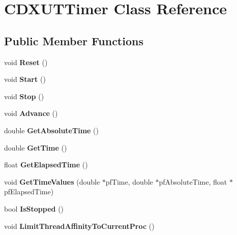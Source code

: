 \hypertarget{class_c_d_x_u_t_timer}{\section{C\+D\+X\+U\+T\+Timer Class Reference}
\label{class_c_d_x_u_t_timer}
}
\subsection*{Public Member Functions}
\begin{DoxyCompactItemize}
\item 
\hypertarget{class_c_d_x_u_t_timer_adc40e951f6157dc82883294a19f8e04b}{void {\bfseries Reset} ()}\label{class_c_d_x_u_t_timer_adc40e951f6157dc82883294a19f8e04b}

\item 
\hypertarget{class_c_d_x_u_t_timer_a970f9d5dc0b3b84f6445ec756c188f4b}{void {\bfseries Start} ()}\label{class_c_d_x_u_t_timer_a970f9d5dc0b3b84f6445ec756c188f4b}

\item 
\hypertarget{class_c_d_x_u_t_timer_a6e0b8b06ade854d7bc8f190cee75de11}{void {\bfseries Stop} ()}\label{class_c_d_x_u_t_timer_a6e0b8b06ade854d7bc8f190cee75de11}

\item 
\hypertarget{class_c_d_x_u_t_timer_a1a40a2b93164867f6d895b755a6e2938}{void {\bfseries Advance} ()}\label{class_c_d_x_u_t_timer_a1a40a2b93164867f6d895b755a6e2938}

\item 
\hypertarget{class_c_d_x_u_t_timer_a0a742c4999a06c61c8558f58ef9211ce}{double {\bfseries Get\+Absolute\+Time} ()}\label{class_c_d_x_u_t_timer_a0a742c4999a06c61c8558f58ef9211ce}

\item 
\hypertarget{class_c_d_x_u_t_timer_a48c372d2d7ba669872d4a77d46aec33b}{double {\bfseries Get\+Time} ()}\label{class_c_d_x_u_t_timer_a48c372d2d7ba669872d4a77d46aec33b}

\item 
\hypertarget{class_c_d_x_u_t_timer_ab39eae40d41c0684d99132d5d42b4a72}{float {\bfseries Get\+Elapsed\+Time} ()}\label{class_c_d_x_u_t_timer_ab39eae40d41c0684d99132d5d42b4a72}

\item 
\hypertarget{class_c_d_x_u_t_timer_a1e8c30855b6baab4993edafba1cca65c}{void {\bfseries Get\+Time\+Values} (double $\ast$pf\+Time, double $\ast$pf\+Absolute\+Time, float $\ast$pf\+Elapsed\+Time)}\label{class_c_d_x_u_t_timer_a1e8c30855b6baab4993edafba1cca65c}

\item 
\hypertarget{class_c_d_x_u_t_timer_a97fbd0e9bbc85c7369df4b1556713751}{bool {\bfseries Is\+Stopped} ()}\label{class_c_d_x_u_t_timer_a97fbd0e9bbc85c7369df4b1556713751}

\item 
\hypertarget{class_c_d_x_u_t_timer_a0e07e5d07c8521dac1b8299c4271742e}{void {\bfseries Limit\+Thread\+Affinity\+To\+Current\+Proc} ()}\label{class_c_d_x_u_t_timer_a0e07e5d07c8521dac1b8299c4271742e}

\end{DoxyCompactItemize}
